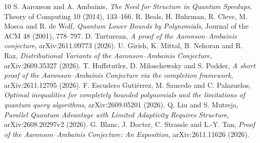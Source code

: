 \documentclass[11pt]{article}
\begin{document}
\begin{thebibliography}{10}
 S. Aaronson and A. Ambainis, \emph{The Need for Structure in Quantum Speedups}, Theory of Computing 10 (2014), 133--166.
 R. Beals, H. Buhrman, R. Cleve, M. Mosca and R. de Wolf, \emph{Quantum Lower Bounds by Polynomials}, Journal of the ACM 48 (2001), 778--797.
 D. Turturean, \emph{A proof of the Aaronson--Ambainis conjecture}, arXiv:2611.09773 (2026).
 U. Girish, K. Mittal, B. Nehoran and R. Raz, \emph{Distributional Variants of the Aaronson--Ambainis Conjecture}, arXiv:2609.35327 (2026).
 T. Huffstutler, D. Miloschewsky and S. Podder, \emph{A short proof of the Aaronson--Ambainis Conjecture via the completion framework}, arXiv:2611.12795 (2026).
 F. Escudero Guti\'errez, M. Saucedo and C. Palazuelos, \emph{Optimal inequalities for completely bounded polynomials and the limitations of quantum query algorithms}, arXiv:2609.05201 (2026).
 Q. Liu and S. Mutreja, \emph{Parallel Quantum Advantage with Limited Adaptivity Requires Structure}, arXiv:2608.20297v2 (2026).
 G. Blanc, J. Docter, C. Strassle and L.-Y. Tan, \emph{Proof of the Aaronson--Ambainis Conjecture: An Exposition}, arXiv:2611.11626 (2026).
\end{thebibliography}
\end{document}
